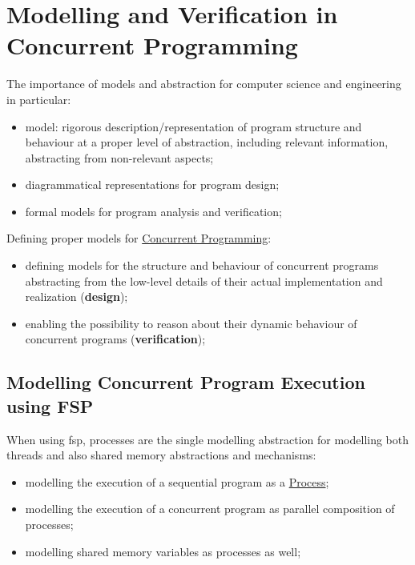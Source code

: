 \chapter{Modelling and Verification in Concurrent Programming}\label{chap:modelling_and_verification_in_concurrent_programming} %
The importance of models and abstraction for computer science and engineering in particular:
\begin{itemize}
    \item model: rigorous description/representation of program structure and behaviour at a proper level of abstraction, including relevant information, abstracting from non-relevant aspects;
    \item diagrammatical representations for program design;
    \item formal models for program analysis and verification;
\end{itemize}
Defining proper models for \hyperref[def:conc-prog]{Concurrent Programming}:
\begin{itemize}
    \item defining models for the structure and behaviour of concurrent programs abstracting from the low-level details of their actual implementation and realization (\textbf{design});
    \item enabling the possibility to reason about their dynamic behaviour of concurrent programs (\textbf{verification});
\end{itemize}
%
\section{Modelling Concurrent Program Execution using FSP}\label{sec:cp_modelling_concurrent_program_execution_using_fsp} %
When using \ac{fsp}, processes are the single modelling abstraction for modelling both threads and also shared memory abstractions and mechanisms:
\begin{itemize}
    \item modelling the execution of a sequential program as a \hyperref[def:process]{Process};
    \item modelling the execution of a concurrent program as parallel composition of processes;
    \item modelling shared memory variables as processes as well;
\end{itemize}
%
